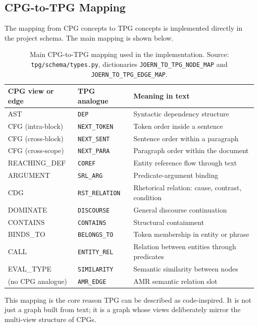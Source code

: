 \documentclass[11pt]{article}
\begin{document}
\subsection{CPG-to-TPG Mapping}

The mapping from CPG concepts to TPG concepts is implemented directly in the
project schema. The main mapping is shown below.

\begin{table}[h]
\centering
\small
\begin{tabular}{lll}
\toprule
CPG view or edge & TPG analogue & Meaning in text \\
\midrule
AST & \texttt{DEP} & Syntactic dependency structure \\
CFG (intra-block) & \texttt{NEXT\_TOKEN} & Token order inside a sentence \\
CFG (cross-block) & \texttt{NEXT\_SENT} & Sentence order within a paragraph \\
CFG (cross-scope) & \texttt{NEXT\_PARA} & Paragraph order within the document \\
REACHING\_DEF & \texttt{COREF} & Entity reference flow through text \\
ARGUMENT & \texttt{SRL\_ARG} & Predicate-argument binding \\
CDG & \texttt{RST\_RELATION} & Rhetorical relation: cause, contrast, condition \\
DOMINATE & \texttt{DISCOURSE} & General discourse continuation \\
CONTAINS & \texttt{CONTAINS} & Structural containment \\
BINDS\_TO & \texttt{BELONGS\_TO} & Token membership in entity or phrase \\
CALL & \texttt{ENTITY\_REL} & Relation between entities through predicates \\
EVAL\_TYPE & \texttt{SIMILARITY} & Semantic similarity between nodes \\
(no CPG analogue) & \texttt{AMR\_EDGE} & AMR semantic relation slot \\
\bottomrule
\end{tabular}
\caption{Main CPG-to-TPG mapping used in the implementation. Source:
\texttt{tpg/schema/types.py}, dictionaries \texttt{JOERN\_TO\_TPG\_NODE\_MAP}
and \texttt{JOERN\_TO\_TPG\_EDGE\_MAP}.}
\end{table}

This mapping is the core reason TPG can be described as code-inspired. It is
not just a graph built from text; it is a graph whose views deliberately mirror
the multi-view structure of CPGs.
\end{document}
